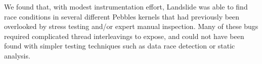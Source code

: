\documentclass{llncs}
\begin{document}

We found that, with modest instrumentation effort, Landslide was able to find race conditions in several different Pebbles kernels that had previously been overlooked by stress testing and/or expert manual inspection.
Many of these bugs required complicated thread interleavings to expose, and could not have been found with simpler testing techniques such as data race detection or static analysis.

\end{document}
